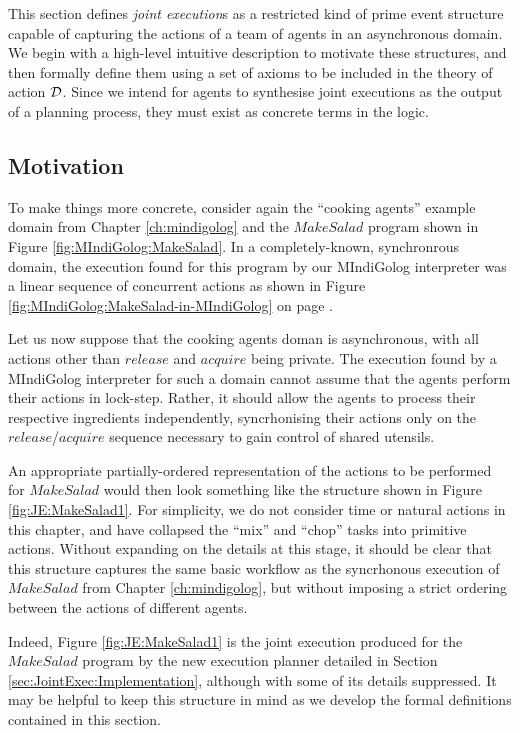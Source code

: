 This section defines \emph{joint execution}s as a restricted kind
of prime event structure capable of capturing the actions of a team
of agents in an asynchronous domain. We begin with a high-level intuitive
description to motivate these structures, and then formally define
them using a set of axioms to be included in the theory of action
$\mathcal{D}$. Since we intend for agents to synthesise joint executions
as the output of a planning process, they must exist as concrete terms
in the logic.


\subsection{Motivation}

To make things more concrete, consider again the {}``cooking agents''
example domain from Chapter \ref{ch:mindigolog} and the $MakeSalad$
program shown in Figure \ref{fig:MIndiGolog:MakeSalad}. In a completely-known,
synchronrous domain, the execution found for this program by our MIndiGolog
interpreter was a linear sequence of concurrent actions as shown in
Figure \ref{fig:MIndiGolog:MakeSalad-in-MIndiGolog} on page \pageref{fig:MIndiGolog:MakeSalad-in-MIndiGolog}.

Let us now suppose that the cooking agents doman is asynchronous,
with all actions other than $release$ and $acquire$ being private.
The execution found by a MIndiGolog interpreter for such a domain
cannot assume that the agents perform their actions in lock-step.
Rather, it should allow the agents to process their respective ingredients
independently, syncrhonising their actions only on the $release$/$acquire$
sequence necessary to gain control of shared utensils.

An appropriate partially-ordered representation of the actions to
be performed for $MakeSalad$ would then look something like the structure
shown in Figure \ref{fig:JE:MakeSalad1}. For simplicity, we do not
consider time or natural actions in this chapter, and have collapsed
the {}``mix'' and {}``chop'' tasks into primitive actions. Without
expanding on the details at this stage, it should be clear that this
structure captures the same basic workflow as the syncrhonous execution
of $MakeSalad$ from Chapter \ref{ch:mindigolog}, but without imposing
a strict ordering between the actions of different agents.

Indeed, Figure \ref{fig:JE:MakeSalad1} is the joint execution produced
for the $MakeSalad$ program by the new execution planner detailed
in Section \ref{sec:JointExec:Implementation}, although with some
of its details suppressed. It may be helpful to keep this structure
in mind as we develop the formal definitions contained in this section.

